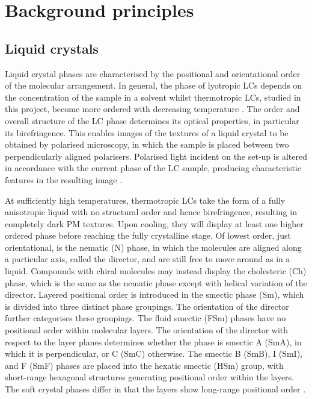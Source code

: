 \documentclass[12pt]{article}
\begin{document}
\section{Background principles}
\subsection{Liquid crystals}
Liquid crystal phases are characterised by the positional and orientational order of the molecular arrangement. In general, the phase of lyotropic LCs depends on the concentration of the sample in a solvent whilst thermotropic LCs, studied in this project, become more ordered with decreasing temperature \cite{Dierking03}. The order and overall structure of the LC phase determines its optical properties, in particular its birefringence. This enables images of the textures of a liquid crystal to be obtained by polarised microscopy, in which the sample is placed between two perpendicularly aligned polarisers. Polarised light incident on the set-up is altered in accordance with the current phase of the LC sample, producing characteristic features in the resulting image \cite{Dierking03}.

At sufficiently high temperatures, thermotropic LCs take the form of a fully anisotropic liquid with no structural order and hence birefringence, resulting in completely dark PM textures. Upon cooling, they will display at least one higher ordered phase before reaching the fully crystalline stage. Of lowest order, just orientational, is the nematic (N) phase, in which the molecules are aligned along a particular axis, called the director, and are still free to move around as in a liquid. Compounds with chiral molecules may instead display the cholesteric (Ch) phase, which is the same as the nematic phase except with helical variation of the director. Layered positional order is introduced in the smectic phase (Sm), which is divided into three distinct phase groupings. The orientation of the director further categorises these groupings. The fluid smectic (FSm) phases have no positional order within molecular layers. The orientation of the director with respect to the layer planes determines whether the phase is smectic A (SmA), in which it is perpendicular, or C (SmC) otherwise. The smectic B (SmB), I (SmI), and F (SmF) phases are placed into the hexatic smectic (HSm) group, with short-range hexagonal structures generating positional order within the layers. The soft crystal phases differ in that the layers show long-range positional order \cite{Dierking03}.
\end{document}
